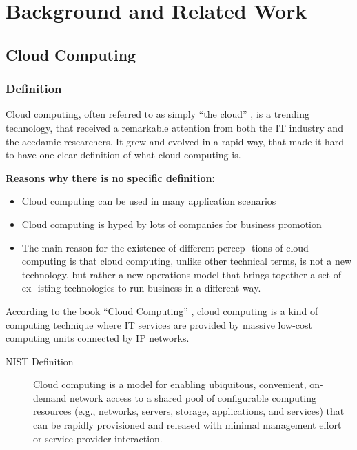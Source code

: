 \chapter{Background and Related Work}
\label{cha:relatedwork}

\section {Cloud Computing}

	\subsection {Definition}
		Cloud computing, often referred to as simply “the cloud” \cite{_ibm_2016}, is a trending technology, that received a remarkable attention from both the IT industry and the acedamic researchers. It grew and evolved in a rapid way, that made it hard to have one clear definition of what cloud computing is.

		\textbf{Reasons why there is no specific definition:}
		\begin{itemize}
			\item {Cloud computing can be used in many application scenarios}\cite{qian_cloud_2009}
			\item {Cloud computing is hyped by lots of companies for business promotion}\cite{qian_cloud_2009}
			\item {The main reason for the existence of different percep- tions of cloud computing is that cloud computing, unlike other technical terms, is not a new technology, but rather a new operations model that brings together a set of ex- isting technologies to run business in a different way.}\cite{zhang_cloud_2010}
		\end{itemize}

		According to the book ``Cloud Computing'' \cite{qian_cloud_2009}, cloud computing is a kind of computing technique where IT services are provided by massive low-cost computing units connected by IP networks.

		\begin{description}
			\item [NIST Definition] Cloud computing is a model for enabling ubiquitous, convenient, on-demand network access to a shared pool of configurable computing resources (e.g., networks, servers, storage, applications, and services) that can be rapidly provisioned and released with minimal management effort or service provider interaction.\cite{mell_nist_2011}
		\end{description}


